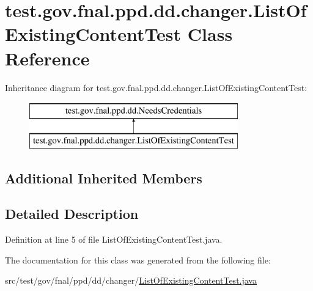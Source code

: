 \hypertarget{classtest_1_1gov_1_1fnal_1_1ppd_1_1dd_1_1changer_1_1ListOfExistingContentTest}{\section{test.\-gov.\-fnal.\-ppd.\-dd.\-changer.\-List\-Of\-Existing\-Content\-Test Class Reference}
\label{classtest_1_1gov_1_1fnal_1_1ppd_1_1dd_1_1changer_1_1ListOfExistingContentTest}
}
Inheritance diagram for test.\-gov.\-fnal.\-ppd.\-dd.\-changer.\-List\-Of\-Existing\-Content\-Test\-:\begin{figure}[H]
\begin{center}
\leavevmode
\includegraphics[height=2.000000cm]{classtest_1_1gov_1_1fnal_1_1ppd_1_1dd_1_1changer_1_1ListOfExistingContentTest}
\end{center}
\end{figure}
\subsection*{Additional Inherited Members}


\subsection{Detailed Description}


Definition at line 5 of file List\-Of\-Existing\-Content\-Test.\-java.



The documentation for this class was generated from the following file\-:\begin{DoxyCompactItemize}
\item 
src/test/gov/fnal/ppd/dd/changer/\hyperlink{ListOfExistingContentTest_8java}{List\-Of\-Existing\-Content\-Test.\-java}\end{DoxyCompactItemize}
